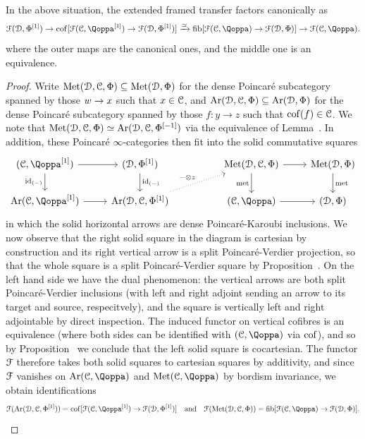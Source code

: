 \begin{proposition}
\label{proposition:tau-is-equiv}%
In the above situation, the extended framed transfer factors canonically as 
\[
\F(\D,\QFD\qshift{1}) \to \cof[\F(\C,\QF\qshift{1}) \to \F(\D,\QFD\qshift{1})]
\xrightarrow\simeq  \fib[\F(\C,\QF) \to \F(\D,\QFD)] \to \F(\C,\QF).
\]
where the  outer maps are the canonical ones, and the middle one is an equivalence. 
\end{proposition}

\begin{proof}
Write $\operatorname{Met}(\mathcal{D},\mathcal C,\Phi) \subseteq \operatorname{Met}(\mathcal{D},\Phi)$ for the dense Poincaré subcategory spanned by those $w \to x$ such that $x \in \mathcal C$, and $\operatorname{Ar}(\mathcal{D},\mathcal C,\Phi) \subseteq \operatorname{Ar}(\mathcal{D},\Phi)$ for the dense Poincaré subcategory spanned by those $f\colon y \to z$ such that $\operatorname{cof}(f) \in \mathcal C$. We note that $\operatorname{Met}(\mathcal{D},\mathcal C,\Phi) \simeq \operatorname{Ar}(\mathcal{D},\mathcal C,\Phi^{[-1]})$ via the 
equivalence of Lemma~. In addition, these Poincaré $\infty$-categories then fit into the solid commutative squares 
\[
\begin{tikzcd}
(\C,\QF\qshift{1}) \ar[r]\ar[d,"\id_{(-)}"'] 
  & (\D,\QFD\qshift{1}) \ar[d,"\id_{(-)}"]  
  && \Met(\D,\C,\QFD) \ar[d,"\met"']\ar[r] 
  & \Met(\D,\QFD) \ar[d,"\met"] 
  \\
  \Ar(\C,\QF\qshift{1}) \ar[r] 
  & \Ar(\D,\C,\QFD\qshift{1})\ar[urr,dotted,"{-\otimes z}"] && (\C,\QF) \ar[r] & (\D,\QFD)
\end{tikzcd}
\]
in which the solid horizontal arrows are dense Poincaré-Karoubi inclusions. We now observe that the right solid square in the diagram is cartesian by construction and its right vertical arrow is a split Poincaré-Verdier projection, so that the whole square is a split Poincaré-Verdier square by Proposition~.
On the left hand side we have the dual phenomenon: the vertical arrows are both split Poincaré-Verdier inclusions (with left and right adjoint sending an arrow to its target and source, respecitvely), and the square is vertically left and right adjointable by direct inspection. The induced functor on vertical cofibres is an equivalence (where both sides can be identified with $(\C,\QF)$ via $\operatorname{cof}$), and so by Proposition~ we conclude that the left solid square is cocartesian. 
The functor $\mathcal{F}$ therefore takes both solid squares to cartesian squares by additivity, and since $\mathcal{F}$ vanishes on $\Ar(\C,\QF)$ and $\Met(\C,\QF)$ by bordism invariance, we obtain identifications
\[
\F(\Ar(\D,\C,\QFD\qshift{1})) = \cof[\F(\C,\QF\qshift{1}) \to \F(\D,\QFD\qshift{1})] \quad\text{and}\quad \F(\Met(\D,\C,\QFD)) = \fib[\F(\C,\QF) \to \F(\D,\QFD)] .
\]



\end{proof}

